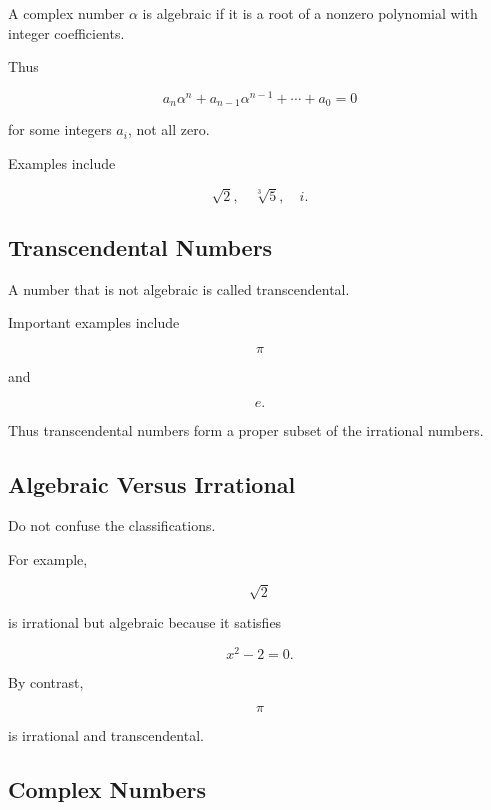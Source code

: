 A complex number \(\alpha\) is algebraic if it is a root of a nonzero
polynomial with integer coefficients.

Thus

\[
\boxed{
a_n\alpha^n
+
a_{n-1}\alpha^{n-1}
+
\cdots
+
a_0
=
0
}
\]

for some integers \(a_i\), not all zero.

Examples include

\[
\boxed{
\sqrt2,
\quad
\sqrt[3]{5},
\quad
i.
}
\]

\subsection{Transcendental Numbers}
\label{subsec:transcendental-numbers-reference}

A number that is not algebraic is called transcendental.

Important examples include

\[
\boxed{
\pi
}
\]

and

\[
\boxed{
e.
}
\]

Thus transcendental numbers form a proper subset of the irrational numbers.

\subsection{Algebraic Versus Irrational}
\label{subsec:algebraic-versus-irrational}

Do not confuse the classifications.

For example,

\[
\boxed{
\sqrt2
}
\]

is irrational but algebraic because it satisfies

\[
x^2-2=0.
\]

By contrast,

\[
\boxed{
\pi
}
\]

is irrational and transcendental.

\subsection{Complex Numbers}
\label{subsec:complex-numbers-reference}

